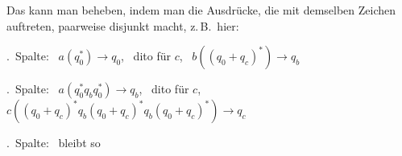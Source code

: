 \begin{frame}
{        \parI
        Das kann man beheben, indem man die Ausdrücke, die mit demselben Zeichen auftreten,
        paarweise disjunkt macht, z.\,B.\ hier:
        
        .\ Spalte:~ $a(q_0^*) \to q_0$,~ dito für $c$,~ $b((q_0+q_c)^*) \to q_b$
        
        .\ Spalte:~ $a(q_0^*q_bq_0^*) \to q_b$,~ dito für $c$,~ $c((q_0+q_c)^*q_b(q_0+q_c)^*q_b(q_0+q_c)^*) \to q_c$
        
        .\ Spalte:~ bleibt so
        
        \par
      }
    \end{frame}

